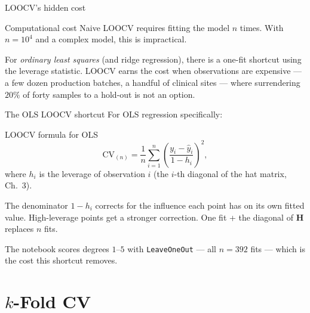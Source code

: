 \documentclass[aspectratio=169,11pt]{beamer}
\begin{document}
\begin{frame}{LOOCV's hidden cost}
  \begin{alertblock}{Computational cost}
    Naive LOOCV requires fitting the model $n$ times. With $n = 10^4$
    and a complex model, this is impractical.
  \end{alertblock}
  \begin{takeaway}
    For \emph{ordinary least squares} (and ridge regression), there
    is a one-fit shortcut using the leverage statistic. LOOCV earns the
    cost when observations are expensive --- a few dozen production
    batches, a handful of clinical sites --- where surrendering $20\%$ of
    forty samples to a hold-out is not an option.
  \end{takeaway}
\end{frame}






\begin{frame}{The OLS LOOCV shortcut}\label{frm:shortcut}
  For OLS regression specifically:
  \begin{block}{LOOCV formula for OLS}
    \[
      \mathrm{CV}_{(n)} = \frac{1}{n}\sum_{i=1}^n
        \left(\frac{y_i - \hat y_i}{1 - h_i}\right)^2,
    \]
    where $h_i$ is the leverage of observation $i$ (the $i$-th
    diagonal of the hat matrix, Ch.~3).
  \end{block}
  \begin{readme}
    The denominator $1 - h_i$ corrects for the influence each point
    has on its own fitted value. High-leverage points get a stronger
    correction. One fit + the diagonal of $\mathbf{H}$ replaces $n$
    fits.
  \end{readme}
  \begin{labnote}
    The notebook scores degrees $1$--$5$ with \texttt{LeaveOneOut} --- all
    $n = 392$ fits --- which is the cost this shortcut removes.
  \end{labnote}
\end{frame}

\section{$k$-Fold CV}
\end{document}
